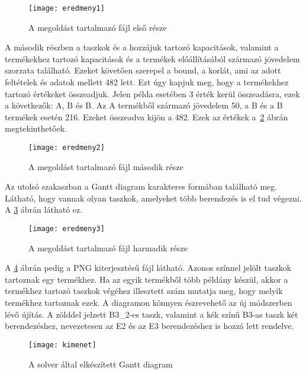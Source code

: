 \begin{figure}[H]
\begin{center}
\texttt{[image: eredmeny1]}
\caption{A megoldást tartalmazó fájl első része}
\label{eredmeny1}
\end{center}
\end{figure}

A második részben a taszkok és a hozzájuk tartozó kapacitások, valamint a termékekhez tartozó kapacitások és a termékek előállításából származó jövedelem szorzata található. Ezeket követően szerepel a bound, a korlát, ami az adott feltételek és adatok mellett 482 lett. Ezt úgy kapjuk meg, hogy a termékekhez tartozó értékeket összeadjuk. Jelen példa esetében 3 érték kerül összeadásra, ezek a következők: A, B és B. Az A termékből származó jövedelem 50, a B és a B termékek esetén 216. Ezeket összeadva kijön a 482. Ezek az értékek a~\ref{eredmeny2} ábrán megtekinthetőek.

\begin{figure}[H]
\begin{center}
\texttt{[image: eredmeny2]}
\caption{A megoldást tartalmazó fájl második része}
\label{eredmeny2}
\end{center}
\end{figure}

Az utolsó szakaszban a Gantt diagram karakteres formában található meg. Látható, hogy vannak olyan taszkok, amelyeket több berendezés is el tud végezni. A \ref{eredmeny3} ábrán látható ez.

\begin{figure}[H]
\begin{center}
\texttt{[image: eredmeny3]}
\caption{A megoldást tartalmazó fájl harmadik része}
\label{eredmeny3}
\end{center}
\end{figure}

A \ref{kimenet} ábrán pedig a PNG kiterjesztésű fájl látható. Azonos színnel jelölt taszkok tartoznak egy termékhez. Ha az egyik termékből több példány készül, akkor a termékhez tartozó taszkok végéhez illesztett szám mutatja meg, hogy melyik termékhez tartoznak ezek. A diagramon könnyen észrevehető az új módszerben lévő újítás. A zölddel jelzett B3\_2-es taszk, valamint a kék színű B3-as taszk két berendezéshez, nevezetesen az E2 és az E3 berendezéshez is hozzá lett rendelve. 
\begin{figure}[H]
\begin{center}
\texttt{[image: kimenet]}
\caption{A solver által elkészített Gantt diagram}
\label{kimenet}
\end{center}
\end{figure}


